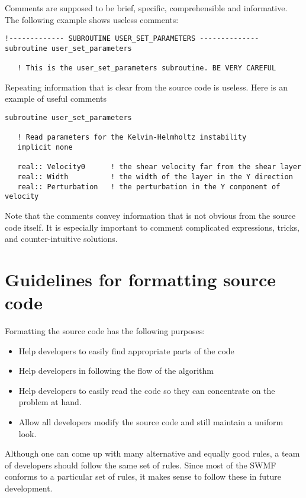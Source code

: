 \documentclass{article}
\begin{document}
Comments are supposed to be brief, specific, comprehensible and informative. 
The following example shows useless comments:
\begin{verbatim}
!------------- SUBROUTINE USER_SET_PARAMETERS --------------
subroutine user_set_parameters

   ! This is the user_set_parameters subroutine. BE VERY CAREFUL
\end{verbatim}
Repeating information that is clear from the source code is useless. Here is
an example of useful comments
\begin{verbatim}
subroutine user_set_parameters

   ! Read parameters for the Kelvin-Helmholtz instability
   implicit none

   real:: Velocity0      ! the shear velocity far from the shear layer
   real:: Width          ! the width of the layer in the Y direction
   real:: Perturbation   ! the perturbation in the Y component of velocity

\end{verbatim}
Note that the comments convey information that is not obvious from the 
source code itself. It is especially important to comment complicated
expressions, tricks, and counter-intuitive solutions. 


\section{Guidelines for formatting source code}

Formatting the source code has the following purposes:
\begin{itemize}
\item Help developers to easily find appropriate parts of the code
\item Help developers in following the flow of the algorithm
\item Help developers to easily read the code so they can concentrate
      on the problem at hand.
\item Allow all developers modify the source code and still maintain 
      a uniform look.
\end{itemize}
Although one can come up with many alternative and equally good rules, 
a team of developers should follow the same set of rules. Since most of 
the SWMF conforms to a particular set of rules, it makes sense to follow
these in future development. 
\end{document}

